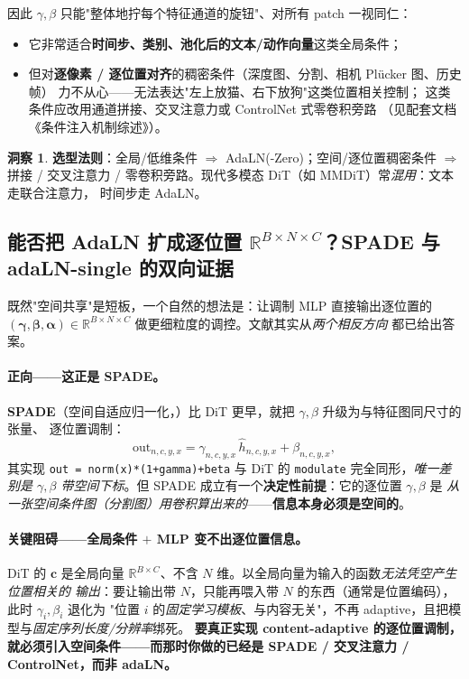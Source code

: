 \documentclass[11pt]{ctexart}
\newcommand{\R}{\mathbb{R}}
\newcommand{\cc}{\mathbf{c}}
\theoremstyle{definition}
\newtheorem{insight}{洞察}[section]
\begin{document}
因此 $\gamma,\beta$ 只能"整体地拧每个特征通道的旋钮"、对所有 patch 一视同仁：
\begin{itemize}
  \item 它非常适合\textbf{时间步、类别、池化后的文本/动作向量}这类全局条件；
  \item 但对\textbf{逐像素 / 逐位置对齐}的稠密条件（深度图、分割、相机 Plücker 图、历史帧）
        力不从心——无法表达"左上放猫、右下放狗"这类位置相关控制；
        这类条件应改用通道拼接、交叉注意力或 ControlNet 式零卷积旁路
        （见配套文档《条件注入机制综述》）。
\end{itemize}

\begin{insight}
\textbf{选型法则}：全局/低维条件 $\Rightarrow$ AdaLN(-Zero)；空间/逐位置稠密条件 $\Rightarrow$ 拼接 /
交叉注意力 / 零卷积旁路。现代多模态 DiT（如 MMDiT）常\emph{混用}：文本走联合注意力，
时间步走 AdaLN。
\end{insight}

\subsection{能否把 AdaLN 扩成逐位置 $\R^{B\times N\times C}$？SPADE 与 adaLN-single 的双向证据}
既然"空间共享"是短板，一个自然的想法是：让调制 MLP 直接输出逐位置的
$(\bm\gamma,\bm\beta,\bm\alpha)\in\R^{B\times N\times C}$ 做更细粒度的调控。文献其实从\emph{两个相反方向}
都已给出答案。

\paragraph{正向——这正是 SPADE。}
\textbf{SPADE}（空间自适应归一化，\cite{spade}）比 DiT 更早，就把 $\gamma,\beta$ 升级为与特征图同尺寸的张量、
逐位置调制：
\[
\text{out}_{n,c,y,x}=\gamma_{n,c,y,x}\,\widehat{h}_{n,c,y,x}+\beta_{n,c,y,x},
\]
其实现 \texttt{out = norm(x)*(1+gamma)+beta} 与 DiT 的 \texttt{modulate} 完全同形，\emph{唯一差别是
$\gamma,\beta$ 带空间下标}。但 SPADE 成立有一个\textbf{决定性前提}：它的逐位置 $\gamma,\beta$ 是
\emph{从一张空间条件图（分割图）用卷积算出来的}——\textbf{信息本身必须是空间的}。

\paragraph{关键阻碍——全局条件 $+$ MLP 变不出逐位置信息。}
DiT 的 $\cc$ 是全局向量 $\R^{B\times C}$、不含 $N$ 维。以全局向量为输入的函数\emph{无法凭空产生位置相关的
输出}：要让输出带 $N$，只能再喂入带 $N$ 的东西（通常是位置编码），此时 $\gamma_i,\beta_i$ 退化为
"位置 $i$ 的\emph{固定学习模板}、与内容无关"，不再 adaptive，且把模型与\emph{固定序列长度/分辨率}绑死。
\textbf{要真正实现 content-adaptive 的逐位置调制，就必须引入空间条件——而那时你做的已经是
SPADE / 交叉注意力 / ControlNet，而非 adaLN。}
\end{document}
